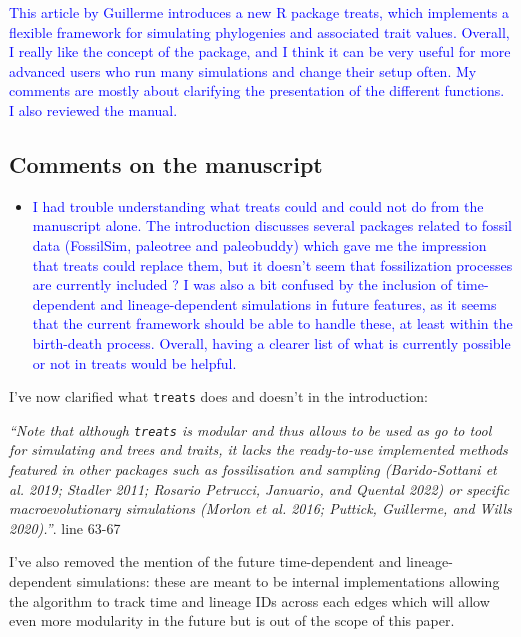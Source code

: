 \documentclass[
]{article}
\providecommand{\tightlist}{%
  \setlength{\itemsep}{0pt}\setlength{\parskip}{0pt}}
\begin{document}
\textcolor{blue}{This article by Guillerme introduces a new R package treats, which
implements a flexible framework for simulating phylogenies and
associated trait values. Overall, I really like the concept of the
package, and I think it can be very useful for more advanced users who
run many simulations and change their setup often. My comments are
mostly about clarifying the presentation of the different functions. I
also reviewed the manual.}

\hypertarget{comments-on-the-manuscript}{%
\subsection{Comments on the
manuscript}\label{comments-on-the-manuscript}}

\begin{itemize}
\tightlist
\item
  \textcolor{blue}{I had trouble understanding what treats could and could not do from
  the manuscript alone. The introduction discusses several packages
  related to fossil data (FossilSim, paleotree and paleobuddy) which
  gave me the impression that treats could replace them, but it doesn't
  seem that fossilization processes are currently included ? I was also
  a bit confused by the inclusion of time-dependent and
  lineage-dependent simulations in future features, as it seems that the
  current framework should be able to handle these, at least within the
  birth-death process. Overall, having a clearer list of what is
  currently possible or not in treats would be helpful.}
\end{itemize}

I've now clarified what \texttt{treats} does and doesn't in the
introduction:

\emph{``Note that although \texttt{treats} is modular and thus allows to
be used as go to tool for simulating and trees and traits, it lacks the
ready-to-use implemented methods featured in other packages such as
fossilisation and sampling (Barido-Sottani et al. 2019; Stadler 2011;
Rosario Petrucci, Januario, and Quental 2022) or specific
macroevolutionary simulations (Morlon et al. 2016; Puttick, Guillerme,
and Wills 2020).''}. line 63-67

I've also removed the mention of the future time-dependent and
lineage-dependent simulations: these are meant to be internal
implementations allowing the algorithm to track time and lineage IDs
across each edges which will allow even more modularity in the future
but is out of the scope of this paper.
\end{document}
